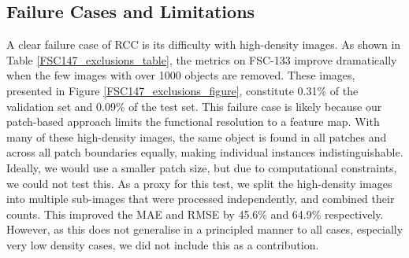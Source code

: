 \documentclass[letterpaper, 11pt]{IEEEtran}
\begin{document}
\subsection{Failure Cases and Limitations}
\label{failure_cases}
A clear failure case of RCC is its difficulty with high-density images.
As shown in Table \ref{FSC147_exclusions_table}, the metrics on FSC-133 improve dramatically when the few images with over 1000 objects are removed.
These images, presented in Figure \ref{FSC147_exclusions_figure}, constitute 0.31\% of the validation set and 0.09\% of the test set.
This failure case is likely because our patch-based approach limits the functional resolution to a  feature map.
With many of these high-density images, the same object is found in all patches and across all patch boundaries equally, making individual instances indistinguishable. 
Ideally, we would use a smaller patch size, but due to computational constraints, we could not test this.
As a proxy for this test, we split the high-density images into multiple sub-images that were processed independently, and combined their counts.
This improved the  MAE and RMSE by 45.6\% and 64.9\% respectively. 
However, as this does not generalise in a principled manner to all cases, especially very low density cases, we did not include this as a contribution.
\end{document}
